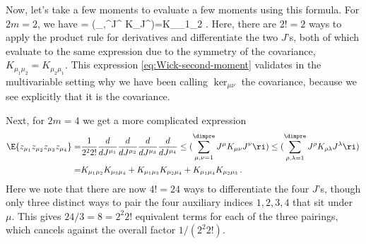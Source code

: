 Now,
let's
take a few moments to
evaluate a few moments using this formula.
For $2m=2$, we have
\be\label{eq:Wick-second-moment}
 =    \le(\sum_{\mu,}^{\dimpre}J^{\mu} K_{\mu\nu}J^{\nu}\ri)=K_{\mu_1\mu_2} .
 \ee
  Here, there are $2!=2$ ways to apply the product rule for derivatives and differentiate the two $J$'s, both of which evaluate to the same expression due to the symmetry of the covariance, $K_{\mu_1 \mu_2}=K_{\mu_2 \mu_1}$. This expression \eqref{eq:Wick-second-moment} validates in the multivariable setting why we have been calling $\ker_{\mu\nu}$ the covariance, because we see explicitly that it is the covariance.


Next, for $2m=4$ we get a more complicated expression
\begin{align}\label{eq:Wick-fourth-moment}
\E{z_{\mu_1}z_{\mu_2}z_{\mu_{3}} z_{\mu_{4}}}=& \frac{1}{2^2 2!} \frac{d}{d J^{\mu_1}}  \frac{d}{d J^{\mu_2}} \frac{d}{d J^{\mu_3}}  \frac{d}{d J^{\mu_4}}\le(\sum_{\mu,\nu=1}^{\dimpre}J^{\mu} K_{\mu\nu}J^{\nu}\ri)\le(\sum_{\rho,\lambda=1}^{\dimpre}J^{\rho} K_{\rho\lambda}J^{\lambda}\ri)\, \notag\\
=& K_{\mu_1\mu_2}K_{\mu_3\mu_4}+K_{\mu_1\mu_3}K_{\mu_2\mu_4}+K_{\mu_1\mu_4}K_{\mu_2\mu_3}\, .
 \end{align}
Here we note
that there are now $4!=24$ ways to differentiate the four $J$'s, though only three distinct ways to pair the four auxiliary indices $1,2,3,4$ that sit under $\mu$. This gives $24/3=8=2^2 2!$ equivalent terms for each of the three pairings, which cancels against the overall factor $1/(2^2 2!)$.


